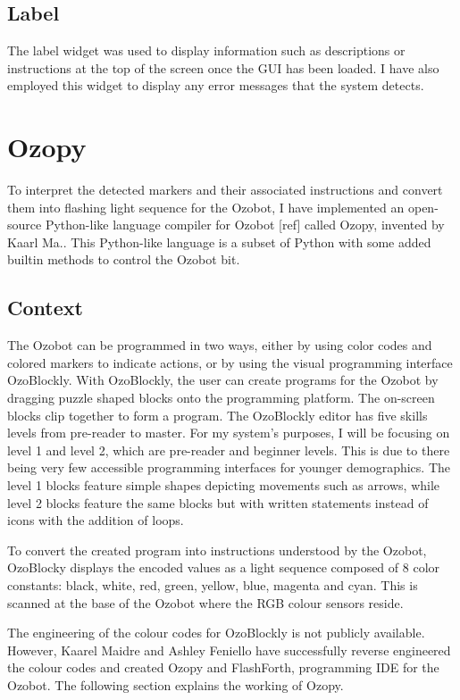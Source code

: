 \documentclass[oneside,%
                    author={Malak Hajji},
                    degree={BSc},
                    title={Designing An Accessible Computational Toolkit For Students},
                  subtitle={With Mixed Visual Abilities}]{dissertation}
\begin{document}
\subsection{Label}
The label widget was used to display information such as descriptions or instructions at the top of the screen once the GUI has been loaded. I have also employed this widget to display any error messages that the system detects.

\section{Ozopy}
To interpret the detected markers and their associated instructions and convert them into flashing light sequence for the Ozobot, I have implemented an open-source Python-like language compiler for Ozobot [ref] called Ozopy, invented by Kaarl Ma..  This Python-like language is a subset of Python with some added builtin methods to control the Ozobot bit.

\subsection{Context}

The Ozobot can be programmed in two ways, either by using color codes and colored markers to indicate actions, or by using the visual programming interface OzoBlockly. With OzoBlockly, the user can create programs for the Ozobot by dragging puzzle shaped blocks onto the programming platform. The on-screen blocks clip together to form a program. The OzoBlockly editor has five skills levels from pre-reader to master.
For my system’s purposes, I will be focusing on level 1 and level 2, which are pre-reader and beginner levels. This is due to there being very few accessible programming interfaces for younger demographics. The level 1 blocks feature simple shapes depicting movements such as arrows, while level 2 blocks feature the same blocks but with written statements instead of icons with the addition of loops. 

To convert the created program into instructions understood by the Ozobot, OzoBlocky displays the encoded values as a light sequence composed of 8 color constants: black, white, red, green, yellow, blue, magenta and cyan. This is scanned at the base of the Ozobot where the RGB colour sensors reside. 

The engineering of the colour codes for OzoBlockly is not publicly available. However, Kaarel Maidre and Ashley Feniello have successfully reverse engineered the colour codes and created Ozopy and FlashForth, programming IDE for the Ozobot. The following section explains the working of Ozopy.  
\end{document}
